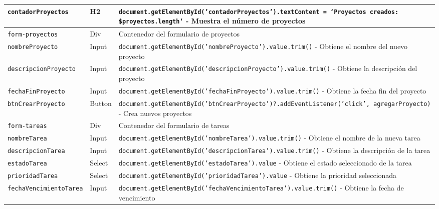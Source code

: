 \documentclass[12pt,a4paper]{article}
\begin{document}
\begin{longtable}{|p{4cm}|p{3cm}|p{8cm}|}
\texttt{contadorProyectos} & H2 & \texttt{document.getElementById('contadorProyectos').textContent = `Proyectos creados: \${proyectos.length}`} - Muestra el número de proyectos \\
\hline

\texttt{form-proyectos} & Div & Contenedor del formulario de proyectos \\
\hline

\texttt{nombreProyecto} & Input & \texttt{document.getElementById('nombreProyecto').value.trim()} - Obtiene el nombre del nuevo proyecto \\
\hline

\texttt{descripcionProyecto} & Input & \texttt{document.getElementById('descripcionProyecto').value.trim()} - Obtiene la descripción del proyecto \\
\hline

\texttt{fechaFinProyecto} & Input & \texttt{document.getElementById('fechaFinProyecto').value.trim()} - Obtiene la fecha fin del proyecto \\
\hline

\texttt{btnCrearProyecto} & Button & \texttt{document.getElementById('btnCrearProyecto')?.addEventListener('click', agregarProyecto)} - Crea nuevos proyectos \\
\hline

\texttt{form-tareas} & Div & Contenedor del formulario de tareas \\
\hline

\texttt{nombreTarea} & Input & \texttt{document.getElementById('nombreTarea').value.trim()} - Obtiene el nombre de la nueva tarea \\
\hline

\texttt{descripcionTarea} & Input & \texttt{document.getElementById('descripcionTarea').value.trim()} - Obtiene la descripción de la tarea \\
\hline

\texttt{estadoTarea} & Select & \texttt{document.getElementById('estadoTarea').value} - Obtiene el estado seleccionado de la tarea \\
\hline

\texttt{prioridadTarea} & Select & \texttt{document.getElementById('prioridadTarea').value} - Obtiene la prioridad seleccionada \\
\hline

\texttt{fechaVencimientoTarea} & Input & \texttt{document.getElementById('fechaVencimientoTarea').value.trim()} - Obtiene la fecha de vencimiento \\
\hline


\end{longtable}
\end{document}
